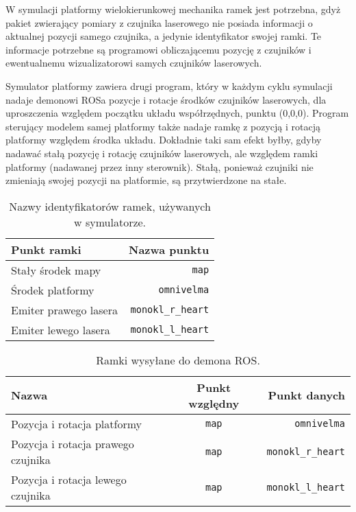 	W symulacji platformy wielokierunkowej mechanika ramek jest potrzebna, gdyż pakiet zwierający pomiary z czujnika laserowego nie posiada informacji o aktualnej
	pozycji samego czujnika, a jedynie identyfikator swojej ramki. Te informacje potrzebne są programowi obliczającemu pozycję z czujników i ewentualnemu wizualizatorowi samych
	czujników laserowych.
	
	Symulator platformy zawiera drugi program, który w każdym cyklu symulacji nadaje demonowi ROSa pozycje i rotacje środków czujników laserowych, dla uproszczenia
	względem początku układu współrzędnych, punktu (0,0,0). 
	Program sterujący modelem samej platformy także nadaje ramkę z pozycją i rotacją platformy względem środka układu.
	Dokładnie taki sam efekt byłby, gdyby nadawać stałą pozycję i rotację czujników laserowych, ale względem ramki platformy (nadawanej przez inny sterownik).
	Stałą, ponieważ czujniki nie zmieniają swojej pozycji na platformie, są przytwierdzone na stałe.
	
	\begin{table}
	\centering
	\begin{tabular}{l r}
	Punkt ramki & Nazwa punktu \\
	\hline
	Stały środek mapy & \texttt{map} \\
	Środek platformy & \texttt{omnivelma} \\
	Emiter prawego lasera & \texttt{monokl\_r\_heart} \\
	Emiter lewego lasera & \texttt{monokl\_l\_heart} \\
	\end{tabular}
	\caption{Nazwy identyfikatorów ramek, używanych w symulatorze.}
	\label{tab:frames}
	\end{table}
	
	\begin{table}
	\centering
	\begin{tabular}{l c r}
	Nazwa & Punkt względny & Punkt danych \\
	\hline
	Pozycja i rotacja platformy & \texttt{map} & \texttt{omnivelma} \\
	Pozycja i rotacja prawego czujnika & \texttt{map} & \texttt{monokl\_r\_heart} \\
	Pozycja i rotacja lewego czujnika & \texttt{map} & \texttt{monokl\_l\_heart} \\
	\end{tabular}
	\caption{Ramki wysyłane do demona ROS.}
	\label{tab:frame_send}
	\end{table}

